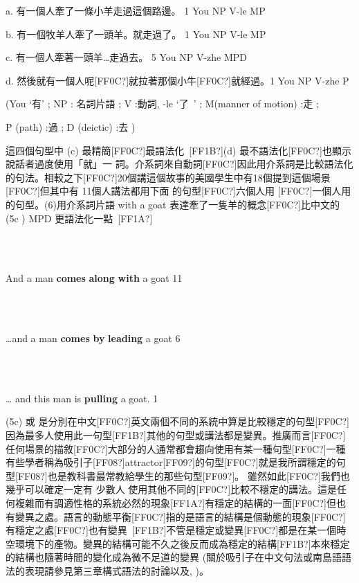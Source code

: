    a.  有一個人牽了一條小羊走過這個路邊。        1   You NP V-le MP

b.  有一個牧羊人牽了一頭羊。就走過了。       1   You NP V-le MP          

c.  有一個人牽著一頭羊…走過去。             5   You NP V-zhe MPD

d.  然後就有一個人呢[FF0C?]就拉著那個小牛[FF0C?]就經過。1  You NP V-zhe  P                                                                             

(You ‘有’ ; NP : 名詞片語 ; V :動詞, -le ‘了~’ ;   M(manner of motion) :走 ; 

P (path) :過 ; D (deictic) :去 )~

這四個句型中 (c) 最精簡[FF0C?]最語法化~[FF1B?](d) 最不語法化[FF0C?]也顯示說話者過度使用「就」一 詞。介系詞來自動詞[FF0C?]因此用介系詞是比較語法化的句法。相較之下[FF0C?]20個講這個故事的美國學生中有18個提到這個場景[FF0C?]但其中有 11個人講法都用下面 的句型[FF0C?]六個人用 [FF0C?]一個人用  的句型。(6)用介系詞片語 with a goat  表達牽了一隻羊的概念[FF0C?]比中文的 (5c ) MPD 更語法化一點~[FF1A?]

\ea%
\label{ex:key:6}
\gll\\
\\
\glt
\z

And a man \textbf{comes} \textbf{along} \textbf{with} a goat         11

\ea%
\label{ex:key:7}
\gll\\
\\
\glt
\z

…and a man \textbf{comes} \textbf{by} \textbf{leading} a goat        6

\ea%
\label{ex:key:8}
\gll\\
\\
\glt
\z

… and this man is \textbf{pulling} a goat.             1

(5c) 或  是分別在中文[FF0C?]英文兩個不同的系統中算是比較穩定的句型[FF0C?]因為最多人使用此一句型[FF1B?]其他的句型或講法都是變異。推廣而言[FF0C?]任何場景的描敘[FF0C?]大部分的人通常都會趨向使用有某一種句型[FF0C?]一種有些學者稱為吸引子[FF08?]attractor[FF09?]的句型[FF0C?]就是我所謂穩定的句型[FF08?]也是教科書最常教給學生的那些句型[FF09?]。 雖然如此[FF0C?]我們也幾乎可以確定一定有 少數人 使用其他不同的[FF0C?]比較不穩定的講法。這是任何複雜而有調適性格的系統必然的現象[FF1A?]有穩定的結構的一面[FF0C?]但也有變異之處。語言的動態平衡[FF0C?]指的是語言的結構是個動態的現象[FF0C?]有穩定之處[FF0C?]也有變異~[FF1B?]不管是穩定或變異[FF0C?]都是在某一個時空環境下的產物。變異的結構可能不久之後反而成為穩定的結構[FF1B?]本來穩定的結構也隨著時間的變化成為微不足道的變異 (關於吸引子在中文句法或南島語語法的表現請參見第三章構式語法的討論以及\citealt{Huang2013}, \citealt{Huang2017})。 

